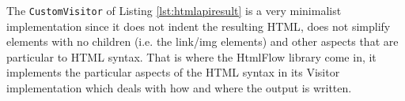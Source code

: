 \noindent
The \texttt{CustomVisitor} of Listing \ref{lst:htmlapiresult} is a very minimalist implementation since it does not indent the resulting \ac{HTML}, does not simplify elements with no children (i.e. the link/img elements) and other aspects that are particular to \ac{HTML} syntax. That is where the HtmlFlow library come in, it implements the particular aspects of the \ac{HTML} syntax in its Visitor implementation which deals with how and where the output is written. 